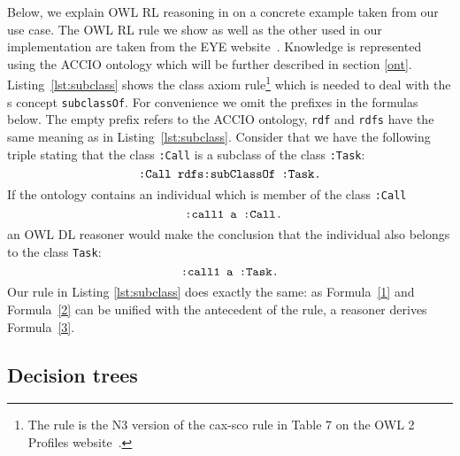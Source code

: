 Below, we explain OWL RL reasoning in \nthree on a concrete example taken from our use case.
The OWL RL rule we show as well as the other used in our implementation are taken from the EYE website~\cite{EYEowl}. %
Knowledge is represented using the ACCIO ontology \cite{accioont} which will be further described in section \ref{ont}.
Listing~\ref{lst:subclass} shows 
the class axiom rule\footnote{The rule is the N3 version of the cax-sco rule in Table 7 on the OWL 2 Profiles website~\cite{OWLRL}.} which is needed 
to deal with the \rdf{}s concept  \verb!subclassOf!.
For convenience we omit the prefixes in the formulas below. The empty prefix refers to the ACCIO ontology, 
 \verb!rdf! and \verb!rdfs! have the same meaning as in Listing~\ref{lst:subclass}. Consider that we have the following %
 triple stating that the class \verb!:Call!
 is 
 a subclass of the class \verb!:Task!:
\begin{equation}
 \verb!:Call rdfs:subClassOf :Task.! \label{1}
\end{equation}
If the ontology %
contains an individual which is member of the class \verb!:Call!
\begin{equation} \verb! :call1 a :Call.! \label{2}\end{equation}
an OWL DL reasoner would make the conclusion that the individual also belongs to the class \verb!Task!: 
\begin{equation}
 \verb!:call1 a :Task.! \label{3}
\end{equation}
Our rule in Listing \ref{lst:subclass} does exactly the same: as Formula~\ref{1} and Formula~\ref{2} can be unified with the antecedent of the rule, a reasoner derives
Formula~\ref{3}. 
%


\subsection{Decision trees}

